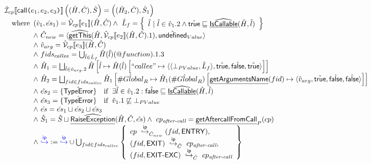 \documentclass{article}
\makeatletter
\newcommand{\SF}[1]{\mbox{\textsf{#1}}}
\newcommand{\TT}[1]{\mbox{\texttt{#1}}}
\newcommand{\ipnext}{\stackrel{\mathsf{ip}}{\hookrightarrow}}
\newcommand{\wherec}[1]{{\rm where}\begin{array}[t]{l}#1\end{array}}
\newcommand{\ifc}[1]{{\rm if}\begin{array}[t]{l}#1\end{array}}
\newcommand{\aI}{\hat{\mathcal{I}}}
\newcommand{\aV}{\hat{\mathcal{V}}}
\newcommand{\set}[1]{\left\{\begin{array}{l}#1\end{array}\right\}}
\newcommand{\lbr}{\llbracket}
\newcommand{\rbr}{\rrbracket}
\newcommand{\hf}[1]{\underline{\sf #1}}
\newcommand{\ahf}[1]{\widehat{\underline{\sf #1}}}
\newcommand{\exc}[1]{{\sf #1}}
\newcommand{\varprop}[1]{@#1}
\newcommand{\avarloc}[1]{\hat{\##1}}
\newcommand{\atrue}{\hat{\SF{true}}}
\newcommand{\afalse}{\hat{\SF{false}}}
\newcommand{\aundef}{\hat{\SF{undefined}}}
\def\inblue{\color{blue}}
\makeatother
\begin{document}
\[\begin{array}{ll}
\aI_{cp}\lbr \SF{call}\TT{(}e_1,e_2,e_3\TT{)} \rbr \left((\hat{H},\hat{C}),\hat{S}\right)
 = \left((\hat{H}_2,\hat{C}),\hat{S}_1\right) \\
\quad\wherec{
  (\hat{v}_1,\hat{es}_1) = \aV_{cp}\lbr e_1\rbr(\hat{H},\hat{C})
  \land\ \hat{L}_f = \set{ \hat{l} ~|~ \hat{l}\in \hat{v}_1.2 \land \atrue\sqsubseteq\ahf{IsCallable}(\hat{H},\hat{l})} \\
  \land\ \hat{C}_{new} = \langle \ahf{getThis}(\hat{H},\aV_{cp}\lbr e_2\rbr(\hat{H},\hat{C}).1), \aundef_{Value} \rangle \\
  \land\ \hat{v}_{arg} = \aV_{cp}\lbr e_3\rbr(\hat{H},\hat{C}) \\
  \land\ fids_{callee}=\bigcup_{\hat{l}\in\hat{L}_f}\hat{H}(\hat{l})(\varprop{function}).1.3\\
  \land\ \hat{H}_1 = \bigsqcup_{\hat{l}\in\hat{v}_{arg}.2}\hat{H} \left[
        \hat{l} \mapsto \hat{H}(\hat{l}) \left[
            ``callee" \mapsto \langle\langle\bot_{PValue},\hat{L}_f\rangle,\atrue,\afalse,\atrue\rangle
          \right]
  \right]\\
  \land\ \hat{H}_2 = \bigsqcup_{fid\in fids_{callee}}\hat{H}_1 \left[
        \avarloc{Global}_R\mapsto \hat{H}_1(\avarloc{Global}_R) \left[
            \hf{getArgumentsName}(fid)\mapsto \langle\hat{v}_{arg},\atrue,\afalse,\afalse\rangle
          \right]
  \right]\\
    \land\ \hat{es}_2 = \{\hat{\exc{TypeError}}\} \quad\ifc{\exists \hat{l}\in\hat{v}_1.2:\afalse\sqsubseteq\ahf{IsCallable}(\hat{H},\hat{l})}\\
    \land\ \hat{es}_3 = \{\hat{\exc{TypeError}}\} \quad\ifc{\hat{v}_1.1\not\sqsubseteq\bot_{PValue}}\\
    \land\ \hat{es} = \hat{es}_1\sqcup\hat{es}_2\sqcup\hat{es}_3\\
    \land\ \hat{S}_1 = \hat{S}\sqcup\ahf{RaiseException}(\hat{H},\hat{C}, \hat{es})
    \land\ cp_{\textit{after-call}} = \hf{getAftercallFromCall}_P(cp) \\
    \land\ {\inblue \ipnext} :=
    {\inblue \ipnext}\cup\bigcup_{fid\in fids_{callee}}\set{
      cp\ \ipnext_{\hat{C}_{new}} (fid,\SF{ENTRY}), \\
      (fid,\SF{EXIT})\ \ipnext_{\hat{C}}\ cp_{\textit{after-call}} , \\
      (fid,\SF{EXIT-EXC})\ \ipnext_{\hat{C}}\ cp_{\textit{after-call}}
    }\\
}
\\\\
\end{array}
\]
\end{document}
